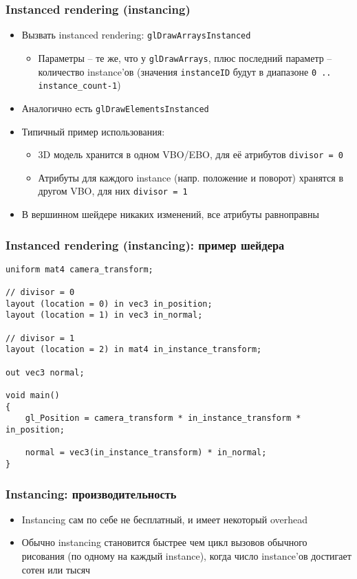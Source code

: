 \documentclass{beamer}
\begin{document}
\begin{frame}[fragile]
\frametitle{Instanced rendering (instancing)}
\begin{itemize}
\item Вызвать instanced rendering: \verb|glDrawArraysInstanced|
\begin{itemize}
\item Параметры -- те же, что у \verb|glDrawArrays|, плюс последний параметр -- количество instance'ов (значения \verb|instanceID| будут в диапазоне \verb|0 .. instance_count-1|)
\end{itemize}
\pause
\item Аналогично есть \verb|glDrawElementsInstanced|
\pause
\item Типичный пример использования:
\begin{itemize}
\item 3D модель хранится в одном VBO/EBO, для её атрибутов \verb|divisor = 0|
\item Атрибуты для каждого instance (напр. положение и поворот) хранятся в другом VBO, для них \verb|divisor = 1|
\end{itemize}
\pause
\item В вершинном шейдере никаких изменений, все атрибуты равноправны
\end{itemize}
\end{frame}

\begin{frame}[fragile]
\frametitle{Instanced rendering (instancing): пример шейдера}
\fontsize{8pt}{8pt}
\begin{verbatim}
uniform mat4 camera_transform;

// divisor = 0
layout (location = 0) in vec3 in_position;
layout (location = 1) in vec3 in_normal;

// divisor = 1
layout (location = 2) in mat4 in_instance_transform;

out vec3 normal;

void main()
{
    gl_Position = camera_transform * in_instance_transform * in_position;

    normal = vec3(in_instance_transform) * in_normal;
}
\end{verbatim}
\end{frame}

\begin{frame}[fragile]
\frametitle{Instancing: производительность}
\begin{itemize}
\item Instancing сам по себе не бесплатный, и имеет некоторый overhead
\pause
\item Обычно instancing становится быстрее чем цикл вызовов обычного рисования (по одному на каждый instance), когда число instance'ов достигает сотен или тысяч
\end{itemize}
\end{frame}
\end{document}
